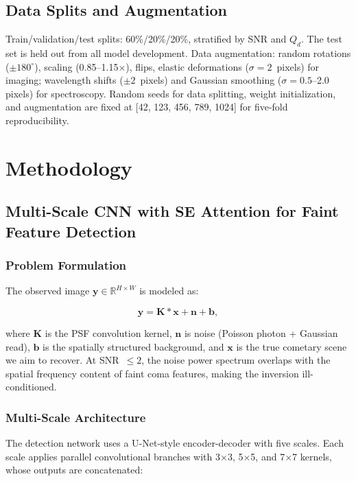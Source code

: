 \documentclass[preprint2]{aastex631}
\begin{document}
\subsection{Data Splits and Augmentation}

Train/validation/test splits: 60\%/20\%/20\%, stratified by SNR and $Q_d$. The test set is held out from all model development. Data augmentation: random rotations ($\pm 180^\circ$), scaling (0.85--1.15$\times$), flips, elastic deformations ($\sigma = 2$~pixels) for imaging; wavelength shifts ($\pm 2$~pixels) and Gaussian smoothing ($\sigma = 0.5$--2.0 pixels) for spectroscopy. Random seeds for data splitting, weight initialization, and augmentation are fixed at [42, 123, 456, 789, 1024] for five-fold reproducibility.

\section{Methodology}\label{sec:methods}

\subsection{Multi-Scale CNN with SE Attention for Faint Feature Detection}

\subsubsection{Problem Formulation}

The observed image $\mathbf{y} \in \mathbb{R}^{H \times W}$ is modeled as:

\begin{equation}\label{eq:forward_model}
\mathbf{y} = \mathbf{K} * \mathbf{x} + \mathbf{n} + \mathbf{b},
\end{equation}

where $\mathbf{K}$ is the PSF convolution kernel, $\mathbf{n}$ is noise (Poisson photon + Gaussian read), $\mathbf{b}$ is the spatially structured background, and $\mathbf{x}$ is the true cometary scene we aim to recover. At SNR~$\leq 2$, the noise power spectrum overlaps with the spatial frequency content of faint coma features, making the inversion ill-conditioned.

\subsubsection{Multi-Scale Architecture}

The detection network uses a U-Net-style encoder-decoder \citep{ronneberger15} with five scales. Each scale applies parallel convolutional branches with 3$\times$3, 5$\times$5, and 7$\times$7 kernels, whose outputs are concatenated:
\end{document}
